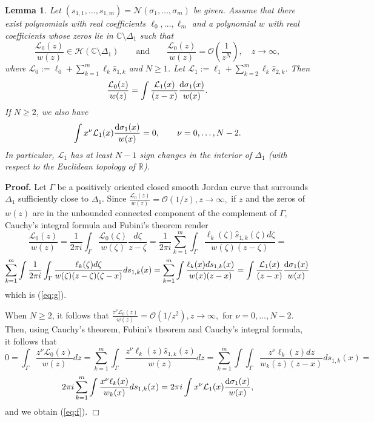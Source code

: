 \documentclass{amsart}
\newtheorem{lemma}{\sc Lemma}[section]
\theoremstyle{definition}
\theoremstyle{remark}
\newcommand{\bl}{\begin{lemma}}
\newcommand{\el}{\end{lemma}}
\newcommand{\fp}{\hfill $\Box$}
\begin{document}
\bl \label{reduc}  Let $(s_{1,1},\ldots,s_{1,m}) = \mathcal{N}(\sigma_1,\ldots,\sigma_m)$ be given. Assume that there exist polynomials with real coefficients $\ell_0,\ldots,\ell_m$ and a polynomial $w$ with real coefficients whose zeros lie in $\mathbb{C} \setminus \Delta_1$  such that
\[\frac{\mathcal{L}_0(z)}{w(z)} \in \mathcal{H}(\mathbb{C} \setminus \Delta_1)\qquad \mbox{and} \qquad \frac{\mathcal{L}_0(z)}{w(z)} = \mathcal{O}\left(\frac{1}{z^N}\right), \quad z \to \infty,
\]
where $\mathcal{L}_0  := \ell_0 + \sum_{k=1}^m \ell_k  \widehat{s}_{1,k} $ and $N \geq 1$. Let $\mathcal{L}_1  := \ell_1 + \sum_{k=2}^m \ell_k  \widehat{s}_{2,k} $. Then
\begin{equation} \label{eq:g}
\frac{\mathcal{L}_0(z)}{w(z)} = \int \frac{\mathcal{L}_1(x)}{(z-x)} \frac{{\rm d}\sigma_1(x)}{w(x)}.
\end{equation}
If $N \geq 2$, we also have
\begin{equation} \label{eq:f}
\int x^{\nu}  \mathcal{L}_1(x)  \frac{{\rm d}\sigma_1(x)}{w(x)} = 0, \qquad \nu = 0,\ldots, N -2.
\end{equation}
In particular, $\mathcal{L}_1$ has at least $N -1$ sign changes in  the interior of  $ {\Delta}_1 $ (with respect to the Euclidean topology of $\mathbb{R}$).
\el

{\bf Proof.} Let $\Gamma $ be a positively oriented closed
smooth Jordan curve that surrounds $\Delta_1$ sufficiently close to $\Delta_1$.
Since $\frac{\mathcal{L}_0(z)}{w(z)}  =
{\mathcal{O}}(1/z), z \to \infty,$  if $z$ and the zeros of $w(z)$ are in the
unbounded connected component of the complement of $\Gamma$, Cauchy's
integral formula and Fubini's theorem render
\[ \frac{\mathcal{L}_0(z)}{w(z)}  = \frac{1}{2\pi i} \int_{\Gamma} \frac{\mathcal{L}_0(\zeta)}{w(\zeta)} \frac{d\zeta}{z-\zeta} = \frac{1}{2\pi i} \sum_{k=1}^m \int_{\Gamma}
\frac{\ell_k(\zeta)\widehat{s}_{1,k}(\zeta)  d\zeta}{w(\zeta)(z-\zeta)} = \] \[
\sum_{k=1}^m \int \frac{1}{2\pi i} \int_{\Gamma} \frac{\ell_k(\zeta)
d\zeta}{w(\zeta)(z-\zeta)(\zeta -x)} ds_{1,k}(x) = \sum_{k=1}^m \int
\frac{\ell_k(x) ds_{1,k}(x)}{w(x)(z-x)} = \int \frac{\mathcal{L}_1(x)}{(z-x)} \frac{{\rm d}\sigma_1(x)}{w(x)}
\]
which is (\ref{eq:g}).


When $N \geq 2$, it follows that $\frac{z^\nu\mathcal{L}_0(z)}{w(z)}  =
{\mathcal{O}}(1/z^2), z \to \infty,$ for $\nu =0,\ldots,N-2$. Then, using Cauchy's theorem, Fubini's
theorem and Cauchy's integral formula, it follows that
\[ 0 = \int_{\Gamma}\frac{z^\nu\mathcal{L}_0(z)}{w(z)}  dz = \sum_{k=1}^m \int_{\Gamma} \frac{z^\nu\ell_k(z)\widehat{ s}_{1,k}(z)}{w(z)} dz = \sum_{k=1}^m \int
\int_{\Gamma} \frac{z^\nu \ell_k(z)dz}{w_k(z)(z-x)}ds_{1,k}(x) =
\]
\[ 2\pi i \sum_{k=1}^m \int
\frac{x^\nu\ell_k(x) }{w_k(x) }  ds_{1,k}(x) = 2\pi i \int x^{\nu}  \mathcal{L}_1(x)  \frac{{\rm d}\sigma_1(x)}{w(x)} ,
\]
and we obtain (\ref{eq:f}).
\fp
\end{document}
